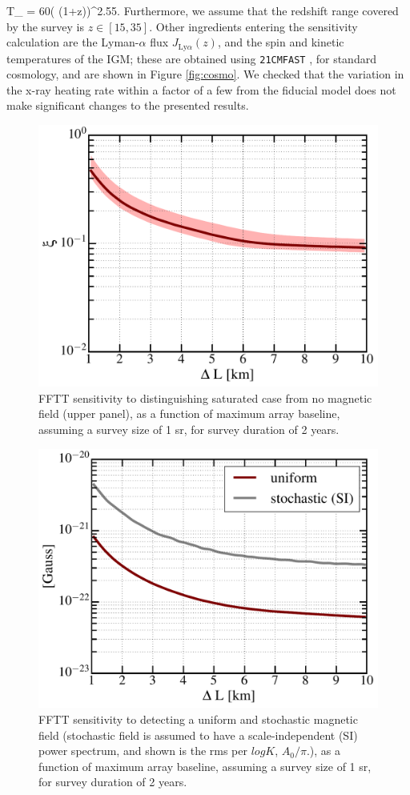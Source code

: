 \beq
T_  = 60\left( (1+z)\right)^{2.55}\text{   [K]}.
\label{eq:tsys}
\eeq
Furthermore, we assume that the redshift range covered by the survey is $z\in[15,35]$.  Other ingredients entering the sensitivity calculation are the Lyman-$\alpha$ flux $J_{\text{Ly}\alpha}(z)$, and the spin and kinetic temperatures of the IGM; these are obtained using \texttt{21CMFAST} \cite{2011MNRAS.411..955M}, for standard cosmology, and are shown in Figure \ref{fig:cosmo}. We checked that the variation in the x-ray heating rate within a factor of a few from the fiducial model does not make significant changes to the presented results.

\begin{figure}
\centering
\includegraphics[width=.35\textwidth,keepaspectratio=true]{xi_vs_deltas.pdf}
\caption{FFTT sensitivity to distinguishing saturated case from no magnetic field (upper panel), as a function of maximum array baseline, assuming a survey size of 1 sr, for survey duration of 2 years.\label{fig:xi_vs_deltas}}
\end{figure}
\begin{figure}
\centering
\includegraphics[width=.35\textwidth,keepaspectratio=true]{B_vs_deltas.pdf}
\caption{FFTT sensitivity to detecting a uniform and stochastic magnetic field (stochastic field is assumed to have a scale-independent (SI) power spectrum, and shown is the rms per $log K$, $A_0/\pi$.), as a function of maximum array baseline, assuming a survey size of 1 sr, for survey duration of 2 years.\label{fig:B_vs_deltas}}
\end{figure}
